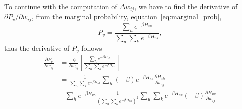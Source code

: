 To continue with the computation of $\Delta w_{ij}$, we have to find the derivative of $\partial P_{v}/\partial w_{ij}$, from the marginal probability, equation~\ref{eq:marginal_prob}, 
\begin{equation}
  P_{v} = \frac{\sum_{h} e^{-\beta H_{v h}}}{\sum_{u} \sum_{k} e^{-\beta H_{u k}}},
  \label{eq:marginal_prob_expansion}
\end{equation}
thus the derivative of $P_{v}$ follows
\begin{equation}
  \begin{split}
    \frac{\partial P_{v}}{\partial w_{ij}} & = \frac{\partial}{\partial w_{ij}} \left[ \frac{\sum_{h} e^{-\beta H_{v h}}}{\sum_{u} \sum_{k} e^{-\beta H_{u k}}} \right] \\
    & = \frac{1}{\sum_{u} \sum_{k} e^{-\beta H_{u k}}} \sum_{h} (-\beta) e^{-\beta H_{v h}} \frac{\partial H_{v h}}{\partial w_{ij}} \\
    & - \sum_{h} e^{-\beta H_{v h}} \frac{1}{{\left( \sum_{u} \sum_{k} e^{-\beta H_{u k}} \right)}^{2}} \sum_{u} \sum_{k} e^{-\beta H_{u k}} (-\beta) \frac{\partial H_{u k}}{\partial w_{ij}}
  \end{split}
  \label{eq:eq14}
\end{equation}


